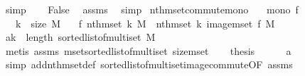 \begin{isabellebody}
\ simp\isanewline
\ \ \isamarkupfalse%
\ {\isachardoublequoteopen}False{\isachardoublequoteclose}\ \isamarkupfalse%
\ assms\ \isamarkupfalse%
\ simp\isanewline
{}\isamarkupfalse%
%
\endisatagproof
{\isafoldproof}%
%
\isadelimproof
\isanewline
%
\endisadelimproof
\isanewline
{}\isamarkupfalse%
\ nth{\isacharunderscore}{\kern0pt}mset{\isacharunderscore}{\kern0pt}commute{\isacharunderscore}{\kern0pt}mono{\isacharcolon}{\kern0pt}\isanewline
\ \ \ {\isachardoublequoteopen}mono\ f{\isachardoublequoteclose}\isanewline
\ \ \ {\isachardoublequoteopen}k\ {\isacharless}{\kern0pt}\ size\ M{\isachardoublequoteclose}\isanewline
\ \ \ {\isachardoublequoteopen}f\ {\isacharparenleft}{\kern0pt}nth{\isacharunderscore}{\kern0pt}mset\ k\ M{\isacharparenright}{\kern0pt}\ {\isacharequal}{\kern0pt}\ nth{\isacharunderscore}{\kern0pt}mset\ k\ {\isacharparenleft}{\kern0pt}image{\isacharunderscore}{\kern0pt}mset\ f\ M{\isacharparenright}{\kern0pt}{\isachardoublequoteclose}\isanewline
%
\isadelimproof
%
\endisadelimproof
%
\isatagproof
{}\isamarkupfalse%
\ {\isacharminus}{\kern0pt}\isanewline
\ \ \isamarkupfalse%
\ a{\isacharcolon}{\kern0pt}{\isachardoublequoteopen}k\ {\isacharless}{\kern0pt}\ length\ {\isacharparenleft}{\kern0pt}sorted{\isacharunderscore}{\kern0pt}list{\isacharunderscore}{\kern0pt}of{\isacharunderscore}{\kern0pt}multiset\ M{\isacharparenright}{\kern0pt}{\isachardoublequoteclose}\isanewline
\ \ \ \ \isamarkupfalse%
\ {\isacharparenleft}{\kern0pt}metis\ assms{\isacharparenleft}{\kern0pt}{}{\isacharparenright}{\kern0pt}\ mset{\isacharunderscore}{\kern0pt}sorted{\isacharunderscore}{\kern0pt}list{\isacharunderscore}{\kern0pt}of{\isacharunderscore}{\kern0pt}multiset\ size{\isacharunderscore}{\kern0pt}mset{\isacharparenright}{\kern0pt}\isanewline
\ \ \isamarkupfalse%
\ {\isacharquery}{\kern0pt}thesis\isanewline
\ \ \ \ \isamarkupfalse%
\ a\ \isamarkupfalse%
\ {\isacharparenleft}{\kern0pt}simp\ add{\isacharcolon}{\kern0pt}nth{\isacharunderscore}{\kern0pt}mset{\isacharunderscore}{\kern0pt}def\ sorted{\isacharunderscore}{\kern0pt}list{\isacharunderscore}{\kern0pt}of{\isacharunderscore}{\kern0pt}multiset{\isacharunderscore}{\kern0pt}image{\isacharunderscore}{\kern0pt}commute{\isacharbrackleft}{\kern0pt}OF\ assms{\isacharparenleft}{\kern0pt}{}{\isacharparenright}{\kern0pt}{\isacharbrackright}{\kern0pt}{\isacharparenright}{\kern0pt}\isanewline

\end{isabellebody}
